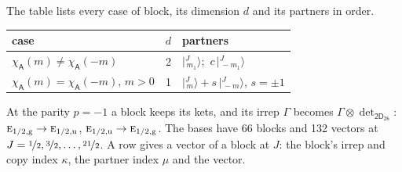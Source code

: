\documentclass[10pt,a4paper]{article}
\numberwithin{equation}{section}
\newcommand{\grp}[1]{\mathsf{#1}}
\newcommand{\irr}[1]{\text{\normalfont\scshape #1}}
\newcommand{\ptag}[1]{\mathrm{#1}}
\newcommand{\chiA}{\chi_{\grp{A}}}
\newcommand{\irrprod}{\otimes}
\newcommand{\mult}{\kappa}
\newcommand{\intx}{\mu}
\newcommand{\jm}[2]{\bigl\lvert{}^{#1}_{\,#2}\bigr\rangle}
\begin{document}
\leavevmode\label{n:head.case}\label{n:head.partners}The table lists every case of block, its dimension $d$ and its partners in order.
\begin{center}\begin{tabular}{@{}lrl@{}}\toprule
case & $d$ & partners\\\midrule
$\chiA(m) \ne \chiA(-m)$ & 2 & $\jm{J}{m_1}$;\ $c\,\jm{J}{-m_1}$\\
$\chiA(m) = \chiA(-m)$, $m > 0$ & 1 & $\jm{J}{m} + s\,\jm{J}{-m}$, $s = \pm1$\\
\bottomrule\end{tabular}\end{center}
At the parity $p = -1$ a block keeps its kets, and its irrep $\Gamma$ becomes $\Gamma \irrprod \det_{\grp{2D_{2h}}}$: $\irr{e}_{1/2,\ptag{g}} \to \irr{e}_{1/2,\ptag{u}}$, $\irr{e}_{1/2,\ptag{u}} \to \irr{e}_{1/2,\ptag{g}}$.
The bases have 66 blocks and 132 vectors at $J = \nicefrac{1}{2}, \nicefrac{3}{2}, \dots, \nicefrac{21}{2}$. \label{n:head.vector}A row gives a vector of a block at $J$: the block's irrep and copy index $\mult$, the partner index $\intx$ and the vector.
\end{document}

